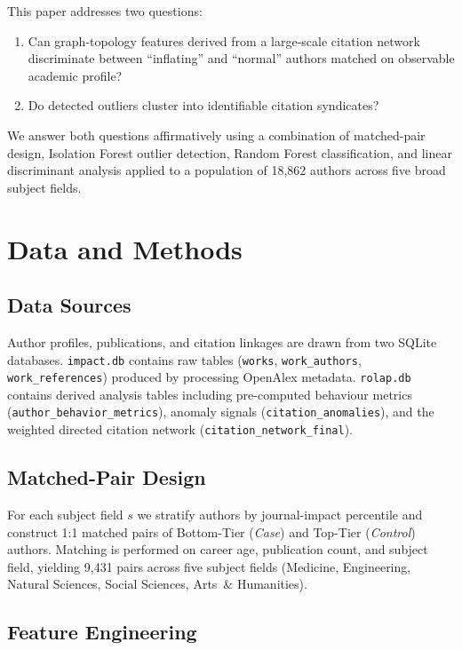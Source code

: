 \documentclass[12pt,a4paper]{article}
\begin{document}
This paper addresses two questions:
\begin{enumerate}
  \item Can graph-topology features derived from a large-scale
        citation network discriminate between ``inflating'' and
        ``normal'' authors matched on observable academic profile?
  \item Do detected outliers cluster into identifiable citation
        syndicates?
\end{enumerate}

We answer both questions affirmatively using a combination of
matched-pair design, Isolation Forest outlier detection, Random
Forest classification, and linear discriminant analysis applied to a
population of 18{,}862 authors across five broad subject fields.

\section{Data and Methods}\label{sec:methods}

\subsection{Data Sources}

Author profiles, publications, and citation linkages are drawn from
two SQLite databases.
\texttt{impact.db} contains raw tables (\texttt{works},
\texttt{work\_authors}, \texttt{work\_references}) produced by
processing OpenAlex metadata.
\texttt{rolap.db} contains derived analysis tables including
pre-computed behaviour metrics (\texttt{author\_behavior\_metrics}),
anomaly signals (\texttt{citation\_anomalies}), and the
weighted directed citation network
(\texttt{citation\_network\_final}).

\subsection{Matched-Pair Design}

For each subject field $s$ we stratify authors by journal-impact
percentile and construct 1:1 matched pairs of Bottom-Tier
(\emph{Case}) and Top-Tier (\emph{Control}) authors.
Matching is performed on career age, publication count, and subject
field, yielding 9{,}431 pairs across five subject fields
(Medicine, Engineering, Natural Sciences, Social Sciences,
Arts~\& Humanities).

\subsection{Feature Engineering}
\end{document}
